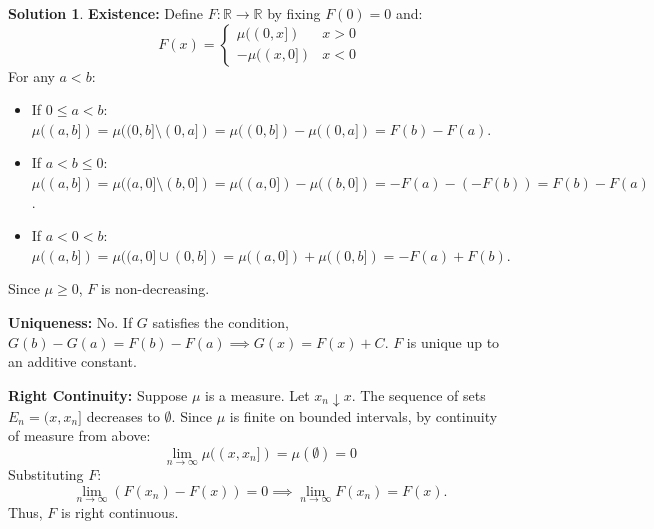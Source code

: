 \documentclass{article}
\theoremstyle{definition}
\newtheorem*{solution}{Solution}
\begin{document}
\begin{solution}
\textbf{Existence:} Define $F: \mathbb{R} \to \mathbb{R}$ by fixing $F(0)=0$ and:
\[ F(x) = \begin{cases} \mu((0, x]) & x > 0 \\ -\mu((x, 0]) & x < 0 \end{cases} \]
For any $a < b$:
\begin{itemize}
    \item If $0 \le a < b$: $\mu((a, b]) = \mu((0, b] \setminus (0, a]) = \mu((0, b]) - \mu((0, a]) = F(b) - F(a)$.
    \item If $a < b \le 0$: $\mu((a, b]) = \mu((a, 0] \setminus (b, 0]) = \mu((a, 0]) - \mu((b, 0]) = -F(a) - (-F(b)) = F(b) - F(a)$.
    \item If $a < 0 < b$: $\mu((a, b]) = \mu((a, 0] \cup (0, b]) = \mu((a, 0]) + \mu((0, b]) = -F(a) + F(b)$.
\end{itemize}
Since $\mu \ge 0$, $F$ is non-decreasing.

\textbf{Uniqueness:} No. If $G$ satisfies the condition, $G(b) - G(a) = F(b) - F(a) \implies G(x) = F(x) + C$. $F$ is unique up to an additive constant.

\textbf{Right Continuity:} Suppose $\mu$ is a measure. Let $x_n \downarrow x$. The sequence of sets $E_n = (x, x_n]$ decreases to $\emptyset$. Since $\mu$ is finite on bounded intervals, by continuity of measure from above:
\[ \lim_{n \to \infty} \mu((x, x_n]) = \mu(\emptyset) = 0 \]
Substituting $F$:
\[ \lim_{n \to \infty} (F(x_n) - F(x)) = 0 \implies \lim_{n \to \infty} F(x_n) = F(x). \]
Thus, $F$ is right continuous.
\end{solution}
\end{document}
